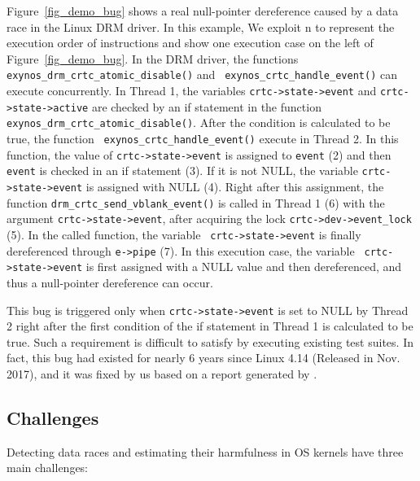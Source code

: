 Figure~\ref{fig_demo_bug} shows a real null-pointer dereference caused by a 
data race in the Linux DRM driver. In this example, We exploit 
\textcircled{\footnotesize{n}} to represent the execution order of instructions 
and show one execution case on the left of Figure~\ref{fig_demo_bug}. In the 
DRM driver, the functions {\tt exynos\_drm\_crtc\_atomic\_disable()} and {\tt 
exynos\_crtc\_handle\_event()} can execute concurrently. In Thread 1, the 
variables {\tt crtc->state->event} and {\tt crtc->state->active} are checked by 
an if statement in the function {\tt exynos\_drm\_crtc\_atomic\_disable()}. 
After the condition is calculated to be true, the function {\tt 
exynos\_crtc\_handle\_event()} execute in Thread 2. In this function, the value 
of {\tt crtc->state->event} is assigned to {\tt event} 
(\textcircled{\footnotesize{2}}) and then {\tt event} is checked in an if 
statement (\textcircled{\footnotesize{3}}). If it is not NULL, the variable 
{\tt crtc->state->event} is assigned with NULL 
(\textcircled{\footnotesize{4}}). Right after this assignment, the function 
{\tt drm\_crtc\_send\_vblank\_event()} is called  in Thread 1 
(\textcircled{\footnotesize{6}}) with the argument {\tt crtc->state->event}, 
after acquiring the lock {\tt crtc->dev->event\_lock} 
(\textcircled{\footnotesize{5}}). In the called function, the variable {\tt 
crtc->state->event} is finally dereferenced through {\tt e->pipe} 
(\textcircled{\footnotesize{7}}). In this execution case, the variable {\tt 
crtc->state->event} is first assigned with a NULL value and then dereferenced, 
and thus a null-pointer dereference can occur.

This bug is triggered only when {\tt crtc->state->event} is set to NULL by 
Thread 2 right after the first condition of the if statement in Thread 1 is 
calculated to be true. Such a requirement is difficult to satisfy by executing 
existing test suites. In fact, this bug had existed for nearly 6 years since 
Linux 4.14 (Released in Nov. 2017), and it was fixed by us based on a report 
generated by \sys. 
 
\subsection{Challenges}
\label{subsec_challenges}
Detecting data races and estimating their harmfulness in OS kernels have three 
main challenges:

